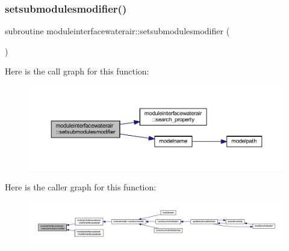\subsubsection{\texorpdfstring{setsubmodulesmodifier()}{setsubmodulesmodifier()}}
{\footnotesize\ttfamily subroutine moduleinterfacewaterair\+::setsubmodulesmodifier (\begin{DoxyParamCaption}{ }\end{DoxyParamCaption})\hspace{0.3cm}{\ttfamily [private]}}

Here is the call graph for this function\+:\nopagebreak
\begin{figure}[H]
\begin{center}
\leavevmode
\includegraphics[width=350pt]{namespacemoduleinterfacewaterair_a5f28ad0176312886bacef9cc171cb2e1_cgraph}
\end{center}
\end{figure}
Here is the caller graph for this function\+:\nopagebreak
\begin{figure}[H]
\begin{center}
\leavevmode
\includegraphics[width=350pt]{namespacemoduleinterfacewaterair_a5f28ad0176312886bacef9cc171cb2e1_icgraph}
\end{center}
\end{figure}
\mbox{\label{namespacemoduleinterfacewaterair_a1d15121ff2d6a7ec0e45dffd0506037a}} 
